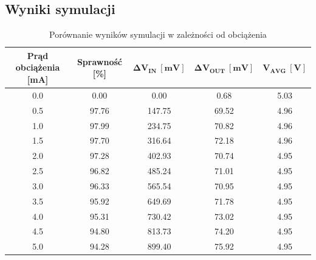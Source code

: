 \documentclass[11pt]{article}
\begin{document}
\subsection{Wyniki symulacji}
\begin{table}[H]
    \centering
    \caption{Porównanie wyników symulacji w zależności od obciążenia}
    \label{tab:efficiency_ripple}
    \begin{tabular}{ccccc}
        \toprule
        \textbf{Prąd obciążenia [mA]} & \textbf{Sprawność [\%]} & $\mathbf{\Delta{V_{IN}} \ [mV]}$ & $\mathbf{\Delta{V_{OUT}} \ [mV]}$ & $\mathbf{V_{AVG} \ [V]}$ \\
        \midrule
        0.0                           & 0.00                    & 0.00                             & 0.68                              & 5.03                     \\
        0.5                           & 97.76                   & 147.75                           & 69.52                             & 4.96                     \\
        1.0                           & 97.99                   & 234.75                           & 70.82                             & 4.96                     \\
        1.5                           & 97.70                   & 316.64                           & 72.18                             & 4.96                     \\
        2.0                           & 97.28                   & 402.93                           & 70.74                             & 4.95                     \\
        2.5                           & 96.82                   & 485.24                           & 71.01                             & 4.95                     \\
        3.0                           & 96.33                   & 565.54                           & 70.95                             & 4.95                     \\
        3.5                           & 95.92                   & 649.69                           & 71.78                             & 4.95                     \\
        4.0                           & 95.31                   & 730.42                           & 73.02                             & 4.95                     \\
        4.5                           & 94.80                   & 813.73                           & 74.20                             & 4.95                     \\
        5.0                           & 94.28                   & 899.40                           & 75.92                             & 4.95                     \\
        \bottomrule
    \end{tabular}
\end{table}
\end{document}
